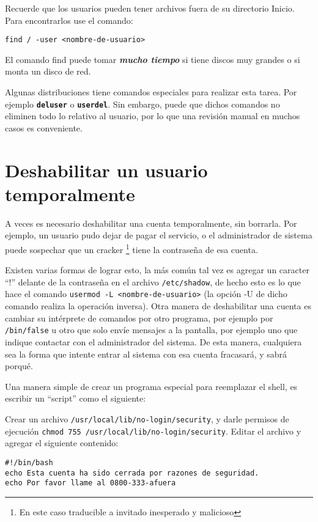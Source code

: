\documentclass[12pt]{article}
\begin{document}
Recuerde que los usuarios pueden tener archivos fuera de su directorio
Inicio.  Para encontrarlos use el comando:

 \texttt{find / -user <nombre-de-usuario>} 

El comando find puede tomar \textit{\bf mucho tiempo} si
tiene discos muy grandes o si monta un disco de red.

Algunas distribuciones tiene comandos especiales para realizar esta tarea. Por 
ejemplo \texttt{\textbf{deluser}} o \texttt{\textbf{userdel}}. Sin embargo, puede 
que dichos comandos no eliminen todo lo relativo al usuario, por lo que una 
revisión manual en muchos casos es conveniente.  



\section{ Deshabilitar un usuario temporalmente}

A veces es necesario deshabilitar una cuenta temporalmente, sin borrarla.
Por ejemplo, un usuario pudo dejar de pagar el servicio, o el administrador de
sistema puede sospechar que un cracker	\footnote{En este caso traducible a 
invitado inesperado y malicioso} tiene la contraseña de esa cuenta.

Existen varias formas de lograr esto, la más común tal vez es agregar un caracter 
``!'' delante de la contraseña en el archivo \texttt{/etc/shadow}, de hecho esto 
es lo que hace el comando \texttt{usermod -L <nombre-de-usuario>} (la opción -U
de dicho comando realiza la operación inversa). Otra manera de deshabilitar una 
cuenta es cambiar su intérprete de comandos por otro programa, por ejemplo por 
\texttt{/bin/false} u otro  que solo envíe mensajes a la pantalla, por 
ejemplo uno que indique contactar con el administrador del sistema. De esta manera, 
cualquiera sea la forma que intente entrar al sistema con esa cuenta fracasará, 
y sabrá porqué. 

Una manera simple de crear un programa especial para reemplazar el shell, 
es escribir un ``script'' como el siguiente: 

Crear un archivo \texttt{/usr/local/lib/no-login/security}, y darle permisos de 
ejecución \texttt{chmod 755 /usr/local/lib/no-login/security}. Editar
el archivo y agregar el siguiente contenido: 

\begin{verbatim} 
#!/bin/bash 
echo Esta cuenta ha sido cerrada por razones de seguridad.
echo Por favor llame al 0800-333-afuera
\end{verbatim}
\end{document}

